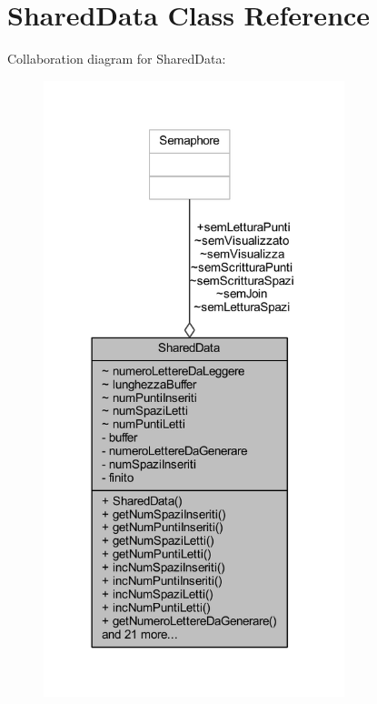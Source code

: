 \hypertarget{classmain_1_1_shared_data}{}\section{Shared\+Data Class Reference}
\label{classmain_1_1_shared_data}


Collaboration diagram for Shared\+Data\+:
\nopagebreak
\begin{figure}[H]
\begin{center}
\leavevmode
\includegraphics[width=248pt]{classmain_1_1_shared_data__coll__graph}
\end{center}
\end{figure}
